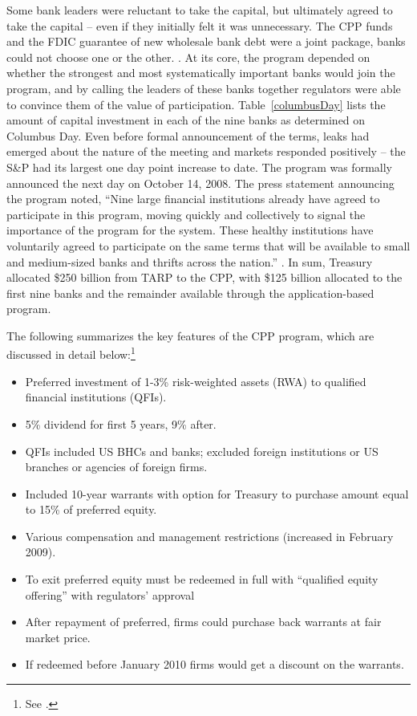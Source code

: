 \documentclass[12pt]{article}
\begin{document}
Some bank leaders were reluctant to take the capital, but ultimately agreed to take the capital -- even if they initially felt it was unnecessary. The CPP funds and the FDIC guarantee of new wholesale bank debt were a joint package, banks could not choose one or the other. \citep{Geithner}. At its core, the program depended on whether the strongest and most systematically important banks would join the program, and by calling the leaders of these banks together regulators were able to convince them of the value of participation. Table~\ref{columbusDay} lists the amount of capital investment in each of the nine banks as determined on Columbus Day. Even before formal announcement of the terms, leaks had emerged about the nature of the meeting and markets responded positively -- the S\&P had its largest one day point increase to date. The program was formally announced the next day on October 14, 2008. The press statement announcing the program noted, ``Nine large financial institutions already have agreed to participate in this program, moving quickly and collectively to signal the importance of the program for the system. These healthy institutions have voluntarily agreed to participate on the same terms that will be available to small and medium-sized banks and thrifts across the nation.'' \citep{CPPAnnouncement}. In sum, Treasury allocated \$250 billion from TARP to the CPP, with \$125 billion allocated to the first nine banks and the remainder available through the application-based program.

The following summarizes the key features of the CPP program, which are discussed in detail below:\footnote{See \citet{mofo}.}

\begin{itemize}[label={--}]
\item Preferred investment of 1-3\% risk-weighted assets (RWA) to qualified financial institutions (QFIs).
\item 5\% dividend for first 5 years, 9\% after.
\item QFIs included US BHCs and banks; excluded foreign institutions or US branches or agencies of foreign firms.
\item Included 10-year warrants with option for Treasury to purchase amount equal to 15\% of preferred equity.
\item Various compensation and management restrictions (increased in February 2009).
\item To exit preferred equity must be redeemed in full with ``qualified equity offering'' with regulators' approval
\item After repayment of preferred, firms could purchase back warrants at fair market price.
\item If redeemed before January 2010 firms would get a discount on the warrants.
\end{itemize}
\end{document}
